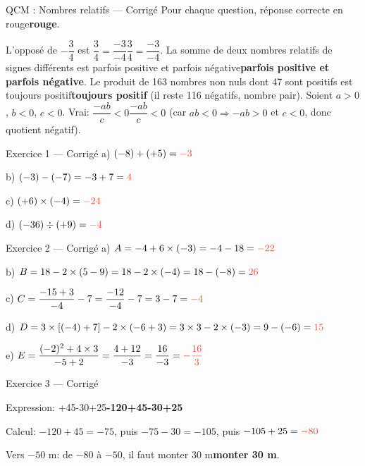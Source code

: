 \documentclass[11pt,a4paper]{article}
\DeclareRobustCommand{\rep}[1]{\begingroup\color{warning}\ifmmode #1\else \textbf{#1}\fi\endgroup}
\begin{document}
	\vspace{0.2cm}
	\begin{center}
	\end{center}
	
	\newpage
	
	\begin{exercisebox}{ QCM : Nombres relatifs — Corrigé}
		Pour chaque question, réponse correcte en \rep{rouge}.
		
		L'opposé de $-\dfrac{3}{4}$ est \rep{$\dfrac{3}{4} = \dfrac{-3}{-4}$}.
		La somme de deux nombres relatifs de signes différents est \rep{parfois positive et parfois négative}.
		Le produit de 163 nombres non nuls dont 47 sont positifs est \rep{toujours positif} (il reste 116 négatifs, nombre pair).
		Soient $a>0$, $b<0$, $c<0$. Vrai: \rep{$\dfrac{-ab}{c}<0$} (car $ab<0\Rightarrow -ab>0$ et $c<0$, donc quotient négatif).
	\end{exercisebox}
	\begin{exercisebox}{ Exercice 1 — Corrigé}
		a) $(-8)+(+5)=\rep{-3}$
		
		b) $(-3)-(-7)=-3+7=\rep{4}$
		
		c) $(+6)\times(-4)=\rep{-24}$
		
		d) $(-36)\div(+9)=\rep{-4}$
	\end{exercisebox}
	
	\begin{exercisebox}{ Exercice 2 — Corrigé}
		a) $A=-4+6\times(-3)=-4-18=\rep{-22}$
		
		b) $B=18-2\times(5-9)=18-2\times(-4)=18-(-8)=\rep{26}$
		
		c) $C=\dfrac{-15+3}{-4}-7=\dfrac{-12}{-4}-7=3-7=\rep{-4}$
		
		d) $D=3\times[(-4)+7]-2\times(-6+3)=3\times3-2\times(-3)=9-(-6)=\rep{15}$
		
		e) $E=\dfrac{(-2)^2+4\times3}{-5+2}=\dfrac{4+12}{-3}=\dfrac{16}{-3}=\rep{-\dfrac{16}{3}}$
	\end{exercisebox}
	
	\begin{exercisebox}{ Exercice 3 — Corrigé}
		
		Expression: \quad \rep{-120+45-30+25}
		
		Calcul: \quad $-120+45=-75$, puis $-75-30=-105$, puis $-105+25=\rep{-80}$
		
		Vers $-50$ m: \quad de $-80$ à $-50$, il faut \rep{monter 30 m}.
	\end{exercisebox}
\end{document}
